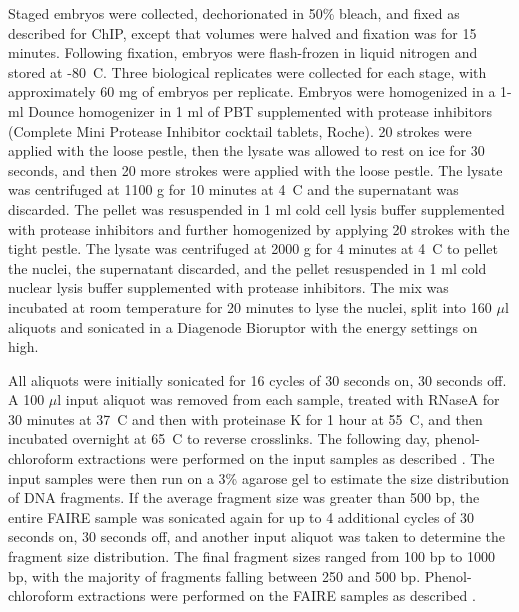 Staged embryos were collected, dechorionated in 50\% bleach, and fixed as described for ChIP, except that volumes were halved and fixation was for 15 minutes. Following fixation, embryos were flash-frozen in liquid nitrogen and stored at -80\degree~C. Three biological replicates were collected for each stage, with approximately 60 mg of embryos per replicate. Embryos were homogenized in a 1-ml Dounce homogenizer in 1 ml of PBT supplemented with protease inhibitors (Complete Mini Protease Inhibitor cocktail tablets, Roche). 20 strokes were applied with the loose pestle, then the lysate was allowed to rest on ice for 30 seconds, and then 20 more strokes were applied with the loose pestle. The lysate was centrifuged at 1100 g for 10 minutes at 4\degree~C and the supernatant was discarded. The pellet was resuspended in 1 ml cold cell lysis buffer supplemented with protease inhibitors and further homogenized by applying 20 strokes with the tight pestle. The lysate was centrifuged at 2000 g for 4 minutes at 4\degree~C to pellet the nuclei, the supernatant discarded, and the pellet resuspended in 1 ml cold nuclear lysis buffer supplemented with protease inhibitors. The mix was incubated at room temperature for 20 minutes to lyse the nuclei, split into 160 \(\mu\)l aliquots and sonicated in a Diagenode Bioruptor with the energy settings on high.

All aliquots were initially sonicated for 16 cycles of 30 seconds on, 30 seconds off. A 100 \(\mu\)l input aliquot was removed from each sample, treated with RNaseA for 30 minutes at 37\degree~C and then with proteinase K for 1 hour at 55\degree~C, and then incubated overnight at 65\degree~C to reverse crosslinks. The following day, phenol-chloroform extractions were performed on the input samples as described \citep{simon_using_2012}. The input samples were then run on a 3\% agarose gel to estimate the size distribution of DNA fragments. If the average fragment size was greater than 500 bp, the entire FAIRE sample was sonicated again for up to 4 additional cycles of 30 seconds on, 30 seconds off, and another input aliquot was taken to determine the fragment size distribution. The final fragment sizes ranged from 100 bp to 1000 bp, with the majority of fragments falling between 250 and 500 bp. Phenol-chloroform extractions were performed on the FAIRE samples as described \citep{simon_using_2012}.

